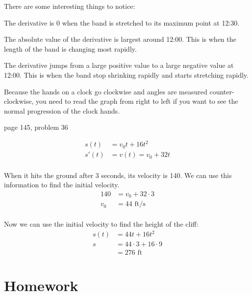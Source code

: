 \documentclass{exam}
\begin{document}
\begin{itemize*}
\begin{solution}
There are some interesting things to notice:
\begin{itemize*}
\item The derivative is 0 when the band is stretched to its maximum point at 12:30.
\item The absolute value of the derivative is largest around 12:00.  This is when the length of the band is changing
  most rapidly.
\item The derivative jumps from a large positive value to a large negative value at 12:00.  This is when the band stop
  shrinking rapidly and starts stretching rapidly.
\item Because the hands on a clock go clockwise and angles are measured counter-clockwise, you need to read the graph
  from right to left if you want to see the normal progression of the clock hands.
\end{itemize*}

\end{solution}

\item page 145, problem 36
\begin{solution}
\begin{align*}
  s(t) &= v_0t + 16t^2 \\
  s'(t) &= v(t) = v_0 + 32t \\
\end{align*}

When it hits the ground after 3 seconds, its velocity is 140.  We can use this information to find the initial velocity.
\begin{align*}
  140 &= v_0 + 32 \cdot 3 \\
  v_0 &= 44 \text{ ft/s}\\
\end{align*}

Now we can use the initial velocity to find the height of the cliff:
\begin{align*}
  s(t) &= 44t + 16t^2 \\
  s &= 44 \cdot 3 + 16 \cdot 9 \\
    &= 276 \text{ ft}
\end{align*}


\end{solution}

\end{itemize*}

\ifprintanswers

\section{Homework}
\end{document}
